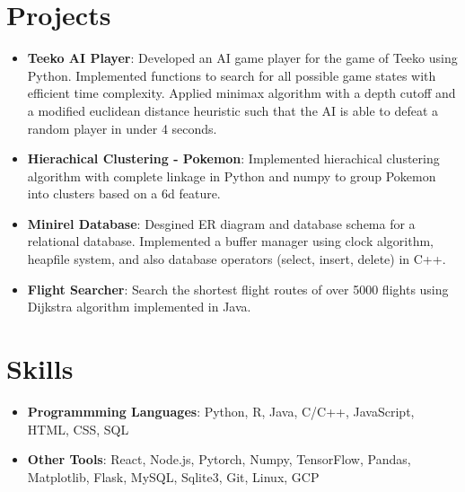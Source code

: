 \documentclass[letterpaper,11pt]{article}
\newcommand{\resumeItem}[2]{
  \item\small{
    \textbf{#1}{: #2 \vspace{-2pt}}
  }
}
\newcommand{\resumeSubItem}[2]{\resumeItem{#1}{#2}\vspace{-4pt}}
\newcommand{\resumeSubHeadingListStart}{\begin{itemize}[leftmargin=*]}
\newcommand{\resumeSubHeadingListEnd}{\end{itemize}}
\begin{document}
\section{Projects}
  \resumeSubHeadingListStart
    \resumeSubItem{Teeko AI Player}
      {Developed an AI game player for the game of Teeko using Python. Implemented functions to search for all possible game states with efficient time complexity. Applied minimax algorithm with a depth cutoff and a modified euclidean distance heuristic such that the AI is able to defeat a random player in under 4 seconds.}
    \resumeSubItem{Hierachical Clustering - Pokemon}
      {Implemented hierachical clustering algorithm with complete linkage in Python and numpy to group Pokemon into clusters based on a 6d feature.}
    \resumeSubItem{Minirel Database}
      {Desgined ER diagram and database schema for a relational database. Implemented a buffer manager using clock algorithm, heapfile system, and also database operators (select, insert, delete) in C++.}
    \resumeSubItem{Flight Searcher}
      {Search the shortest flight routes of over 5000 flights using Dijkstra algorithm implemented in Java.}
  \resumeSubHeadingListEnd

\section{Skills}
    \resumeSubHeadingListStart
        \resumeSubItem{Programmming Languages}
            {Python, R, Java, C/C++, JavaScript, HTML, CSS, SQL}
        \resumeSubItem{Other Tools}
            {React, Node.js, Pytorch, Numpy, TensorFlow, Pandas, Matplotlib, Flask, MySQL, Sqlite3, Git, Linux, GCP}
    \resumeSubHeadingListEnd

%


\end{document}
